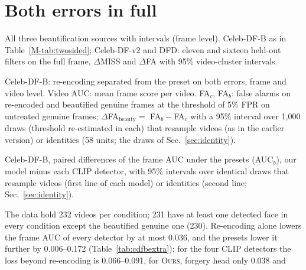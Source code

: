 \documentclass[10pt]{article}
\newcommand{\oursB}{\textsc{Ours}, forgery head only}
\begin{document}
\section{Both errors in full}
\label{sec:twosidedfull}
\begin{table}[H]
\centering
\caption{All three beautification sources with intervals (frame level). Celeb-DF-B as in Table~\ref{M-tab:twosided}; Celeb-DF-v2
and DFD: eleven and sixteen held-out filters on the full frame, $\Delta$MISS and $\Delta$FA with 95\% video-cluster intervals.}
\label{tab:twosidedfull}
\scriptsize
\begin{adjustbox}{max width=\linewidth}\end{adjustbox}
\end{table}
\begin{table}[H]
\centering
\caption{Celeb-DF-B: re-encoding separated from the preset on both errors, frame and video level. Video AUC: mean frame score per
video. FA$_c$, FA$_b$: false alarms on re-encoded and beautified genuine frames at the threshold of 5\% FPR on untreated genuine
frames; $\Delta$FA$_\text{beauty}=$ FA$_b-$FA$_c$ with a 95\% interval over 1,000 draws (threshold re-estimated in each) that
resample videos (as in the earlier version) or identities (58 units; the draws of Sec.~\ref{sec:identity}).}
\label{tab:cdfbextra}
\scriptsize
\begin{adjustbox}{max width=\linewidth}\end{adjustbox}
\end{table}
\begin{table}[H]
\centering
\caption{Celeb-DF-B, paired differences of the frame AUC under the presets (AUC$_b$), our model minus each CLIP detector, with
95\% intervals over identical draws that resample videos (first line of each model) or identities (second line; Sec.~\ref{sec:identity}).}
\label{tab:cdfbpaired}
\footnotesize
\begin{adjustbox}{max width=\linewidth}\end{adjustbox}
\end{table}
The data hold 232 videos per condition; 231 have at least one detected face in every condition except the beautified genuine one
(230). Re-encoding alone lowers the frame AUC of every detector by at most 0.036, and the presets lower it further by 0.006--0.172
(Table~\ref{tab:cdfbextra}); for the four CLIP detectors the loss beyond re-encoding is 0.066--0.091, for \oursB{} 0.038 and
\end{document}
